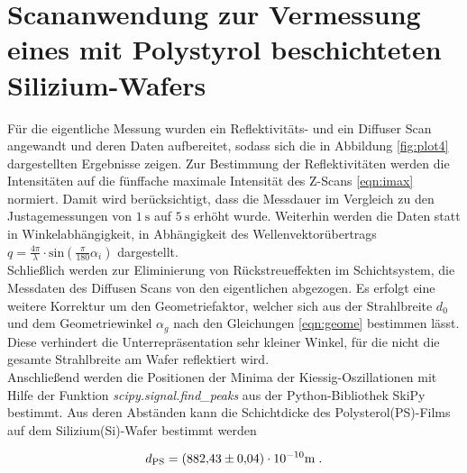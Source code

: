 \section{Scananwendung zur Vermessung eines mit Polystyrol beschichteten Silizium-Wafers}

Für die eigentliche Messung wurden ein Reflektivitäts- und ein Diffuser Scan angewandt und deren Daten aufbereitet,
sodass sich die in Abbildung \ref{fig:plot4} dargestellten Ergebnisse zeigen.
Zur Bestimmung der Reflektivitäten werden die Intensitäten auf die fünffache maximale Intensität des 
Z-Scans \eqref{eqn:imax} normiert. Damit wird berücksichtigt, dass die Messdauer im Vergleich zu den Justagemessungen
von $\SI{1}{\second}$ auf $\SI{5}{\second}$ erhöht wurde.
Weiterhin werden die Daten statt in Winkelabhängigkeit, in Abhängigkeit des Wellenvektorübertrags 
$q = \frac{4\pi}{\lambda} \cdot \text{sin} \left(\frac{\pi}{180}\alpha_i\right)$ dargestellt.\\

Schließlich werden zur Eliminierung von Rückstreueffekten im Schichtsystem, die Messdaten des Diffusen Scans
von den eigentlichen abgezogen.
Es erfolgt eine weitere Korrektur um den Geometriefaktor, welcher sich aus der Strahlbreite $d_0$ und dem 
Geometriewinkel $\alpha_g$ nach den Gleichungen \eqref{eqn:geome} bestimmen lässt. 
Diese verhindert die Unterrepräsentation sehr kleiner Winkel, für die nicht die gesamte Strahlbreite am Wafer 
reflektiert wird.\\
Anschließend werden die Positionen der Minima der Kiessig-Oszillationen mit Hilfe der Funktion
\textit{scipy.signal.find\_peaks} aus der Python-Bibliothek SkiPy bestimmt.
Aus deren Abständen kann die Schichtdicke des Polysterol(PS)-Films auf dem Silizium(Si)-Wafer bestimmt werden

\vspace{-20pt}
\begin{equation*}
    d_\text{PS} = (\num{882.43 +- 0.04}) \cdot 10^{-10} \si{\meter} \; .
\end{equation*}

